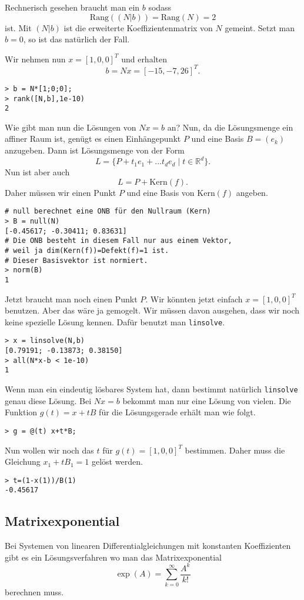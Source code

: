 \documentclass[a4paper,11pt,fleqn]{article}
\begin{document}
Rechnerisch gesehen braucht man ein \(b\) sodass
\[\mathrm{Rang}((N|b))=\mathrm{Rang}(N)=2\]
ist. Mit \((N|b)\) ist die erweiterte Koeffizientenmatrix von \(N\)
gemeint. Setzt man \(b=0\), so ist das natürlich der Fall.

Wir nehmen nun \(x=[1,0,0]^T\) und erhalten
\[b=Nx = [-15,-7,26]^T.\]
\begin{verbatim}
> b = N*[1;0;0];
> rank([N,b],1e-10)
2
\end{verbatim}
Wie gibt man nun die Lösungen von \(Nx=b\) an? Nun, da die
Lösungsmenge ein affiner Raum ist, genügt es einen Einhängepunkt
\(P\) und eine Basis \(B=(e_k)\) anzugeben. Dann ist Lösungsmenge von
der Form
\[L = \{P+t_1e_1+\ldots t_d e_d\;|\; t\in\mathbb R^d\}.\]
Nun ist aber auch
\[L = P+\mathrm{Kern}(f).\]
Daher müssen wir einen Punkt \(P\) und eine Basis von
\(\mathrm{Kern}(f)\) angeben.
\begin{verbatim}
# null berechnet eine ONB für den Nullraum (Kern)
> B = null(N)
[-0.45617; -0.30411; 0.83631]
# Die ONB besteht in diesem Fall nur aus einem Vektor,
# weil ja dim(Kern(f))=Defekt(f)=1 ist.
# Dieser Basisvektor ist normiert.
> norm(B)
1
\end{verbatim}
Jetzt braucht man noch einen Punkt \(P\). Wir könnten jetzt einfach
\(x=[1,0,0]^T\) benutzen. Aber das wäre ja gemogelt. Wir müssen
davon ausgehen, dass wir noch keine spezielle Lösung kennen.
Dafür benutzt man \texttt{linsolve}.
\begin{verbatim}
> x = linsolve(N,b)
[0.79191; -0.13873; 0.38150]
> all(N*x-b < 1e-10)
1
\end{verbatim}
Wenn man ein eindeutig lösbares System hat, dann bestimmt
natürlich \texttt{linsolve} genau diese Lösung. Bei \(Nx=b\)
bekommt man nur eine Lösung von vielen. Die Funktion \(g(t)=x+tB\)
für die Lösungsgerade erhält man wie folgt.
\begin{verbatim}
> g = @(t) x+t*B;
\end{verbatim}
Nun wollen wir noch das \(t\) für \(g(t)=[1,0,0]^T\) bestimmen.
Daher muss die Gleichung \(x_1+tB_1=1\) gelöst werden.
\begin{verbatim}
> t=(1-x(1))/B(1)
-0.45617
\end{verbatim}

\subsection{Matrixexponential}
Bei Systemen von linearen Differentialgleichungen mit konstanten
Koeffizienten gibt es ein Lösungsverfahren wo man das
Matrixexponential
\[\exp(A)=\sum_{k=0}^\infty\frac{A^k}{k!}\]
berechnen muss.
\end{document}
